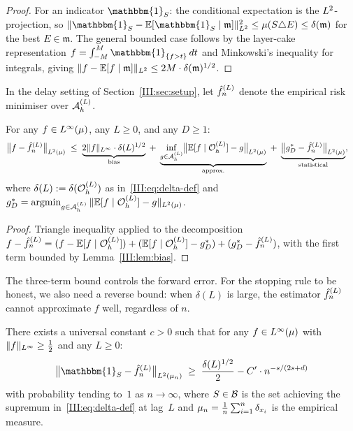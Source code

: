 \begin{proof}
For an indicator $\mathbbm{1}_S$: the conditional expectation is the $L^{2}$-projection, so
$\|\mathbbm{1}_S - \mathbb{E}[\mathbbm{1}_S \mid \mathfrak{m}]\|_{\Lp{2}}^2 \leq \mu(S \triangle E)
\leq \delta(\mathfrak{m})$ for the best $E \in \mathfrak{m}$.
The general bounded case follows by the layer-cake representation
$f = \int_{-M}^{M} \mathbbm{1}_{\{f > t\}}\,dt$ and Minkowski's inequality for integrals,
giving $\|f - \mathbb{E}[f \mid \mathfrak{m}]\|_{L^{2}} \leq 2M \cdot \delta(\mathfrak{m})^{1/2}$.
\end{proof}

In the delay setting of Section~\ref{III:sec:setup}, let $\hat{f}_n^{(L)}$ denote the empirical risk minimiser over $\mathcal{A}_h^{(L)}$.

\begin{lemma}
\label{III:lem:three-term}
For any $f \in L^{\infty}(\mu)$, any $L \geq 0$, and any $D \geq 1$:
\begin{align}
  \bigl\|f - \hat{f}_n^{(L)}\bigr\|_{L^{2}(\mu)}
  &\;\leq\;
    \underbrace{2\|f\|_{L^{\infty}} \cdot \delta(L)^{1/2}}_{\text{bias}}
  \;+\;
    \underbrace{\inf_{g \in \mathcal{A}_h^{(L)}}\bigl\|
      \mathbb{E}[f \mid \mathcal{O}_h^{(L)}] - g
    \bigr\|_{L^{2}(\mu)}}_{\text{approx.}}
  \;+\;
    \underbrace{\bigl\|g_D^* - \hat{f}_n^{(L)}\bigr\|_{L^{2}(\mu)}}_{\text{statistical}},
  \label{III:eq:three-term}
\end{align}
where $\delta(L) := \delta(\mathcal{O}_h^{(L)})$ as in~\eqref{III:eq:delta-def} and
$g_D^* = \operatorname{argmin}_{g \in \mathcal{A}_h^{(L)}} \|\mathbb{E}[f \mid \mathcal{O}_h^{(L)}] - g\|_{L^{2}(\mu)}$.
\end{lemma}

\begin{proof}
Triangle inequality applied to the decomposition
$f - \hat{f}_n^{(L)} = (f - \mathbb{E}[f \mid \mathcal{O}_h^{(L)}]) + (\mathbb{E}[f \mid \mathcal{O}_h^{(L)}] - g_D^*)
+ (g_D^* - \hat{f}_n^{(L)})$, with the first term bounded by Lemma~\ref{III:lem:bias}.
\end{proof}

The three-term bound controls the forward error.
For the stopping rule to be honest, we also need a reverse bound: when
$\delta(L)$ is large, the estimator $\hat{f}_n^{(L)}$ cannot approximate $f$ well,
regardless of $n$.

\begin{lemma}
\label{III:lem:reverse}
There exists a universal constant $c > 0$ such that for any $f \in L^{\infty}(\mu)$
with $\|f\|_{L^{\infty}} \geq \frac{1}{2}$ and any $L \geq 0$:
\[
  \bigl\|\mathbbm{1}_S - \fhat\bigr\|_{\Lp{2}(\mun)}
  \;\geq\;
  \frac{\delta(L)^{1/2}}{2} - C' \cdot n^{-s/(2s+d)}
\]
with probability tending to~$1$ as $n \to \infty$, where $S \in \mathcal{B}$ is
the set achieving the supremum in~\eqref{III:eq:delta-def} at lag~$L$ and
$\mu_n = \frac{1}{n}\sum_{i=1}^n \delta_{x_i}$ is the empirical measure.
\end{lemma}

